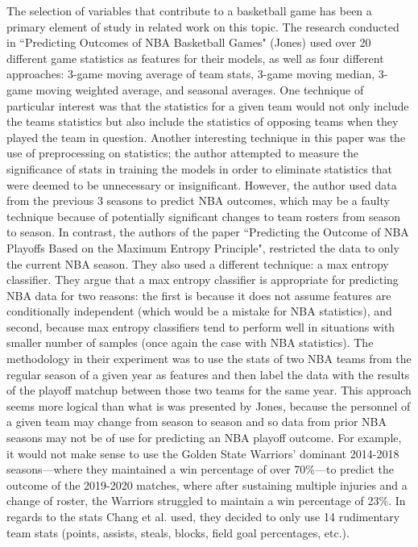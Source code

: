 \documentclass[letterpaper]{article} %
\begin{document}
The selection of variables that contribute to a basketball game has been a primary element of study in related work on this topic. The research conducted in ``Predicting Outcomes of NBA Basketball Games" (Jones) used over 20 different game statistics as features for their models, as well as four different approaches: 3-game moving average of team stats, 3-game moving median, 3-game moving weighted average, and seasonal averages. One technique of particular interest was that the statistics for a given team would not only include the teams statistics but also include the statistics of opposing teams when they played the team in question. Another interesting technique in this paper was the use of preprocessing on statistics; the author attempted to measure the significance of stats in training the models in order to eliminate statistics that were deemed to be unnecessary or insignificant. However, the author used data from the previous 3 seasons to predict NBA outcomes, which may be a faulty technique because of potentially significant changes to team rosters from season to season. In contrast, 
the authors \cite{predicting_maximum_entropy} of the paper ``Predicting the Outcome of NBA Playoffs Based on the Maximum Entropy Principle", restricted the data to only the current NBA season. They also used a different technique: a max entropy classifier. They argue that a max entropy classifier is appropriate for predicting NBA data for two reasons: the first is because it does not assume features are conditionally independent (which would be a mistake for NBA statistics), and second, because max entropy classifiers tend to perform well in situations with smaller number of samples (once again the case with NBA statistics). The methodology in their experiment was to use the stats of two NBA teams from the regular season of a given year  as features and then label the data with the results of the playoff matchup between those two teams for the same year. This approach seems more logical than what is was presented by Jones, because the personnel of a given team may change from season to season and so data from prior NBA seasons may not be of use for predicting an NBA playoff outcome. For example, it would not make sense to use the Golden State Warriors' dominant 2014-2018 seasons---where they maintained a win percentage of over 70\%---to predict the outcome of the 2019-2020 matches, where after sustaining multiple injuries and a change of roster, the Warriors struggled to maintain a win percentage of 23\%. In regards to the stats Chang et al. used, they decided to only use 14 rudimentary team stats (points, assists, steals, blocks, field goal percentages, etc.).
\end{document}
